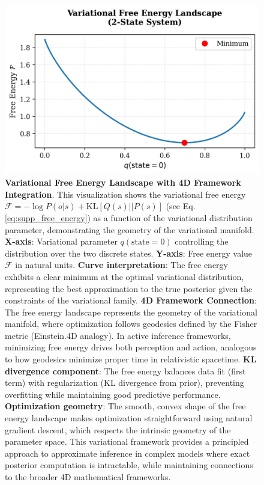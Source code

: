\documentclass[
  10pt,
]{article}
\begin{document}
\begin{figure}
\centering
\includegraphics{../output/figures/free_energy_curve.png}
\caption{\textbf{Variational Free Energy Landscape with 4D Framework
Integration}. This visualization shows the variational free energy
\(\mathcal{F} = -\log P(o|s) + \text{KL}[Q(s)||P(s)]\) (see Eq.
\eqref{eq:supp_free_energy}) as a function of the variational
distribution parameter, demonstrating the geometry of the variational
manifold. \textbf{X-axis}: Variational parameter \(q(\text{state}=0)\)
controlling the distribution over the two discrete states.
\textbf{Y-axis}: Free energy value \(\mathcal{F}\) in natural units.
\textbf{Curve interpretation}: The free energy exhibits a clear minimum
at the optimal variational distribution, representing the best
approximation to the true posterior given the constraints of the
variational family. \textbf{4D Framework Connection}: The free energy
landscape represents the geometry of the variational manifold, where
optimization follows geodesics defined by the Fisher metric (Einstein.4D
analogy). In active inference frameworks, minimizing free energy drives
both perception and action, analogous to how geodesics minimize proper
time in relativistic spacetime. \textbf{KL divergence component}: The
free energy balances data fit (first term) with regularization (KL
divergence from prior), preventing overfitting while maintaining good
predictive performance. \textbf{Optimization geometry}: The smooth,
convex shape of the free energy landscape makes optimization
straightforward using natural gradient descent, which respects the
intrinsic geometry of the parameter space. This variational framework
provides a principled approach to approximate inference in complex
models where exact posterior computation is intractable, while
maintaining connections to the broader 4D mathematical frameworks.}
\end{figure}
\end{document}

